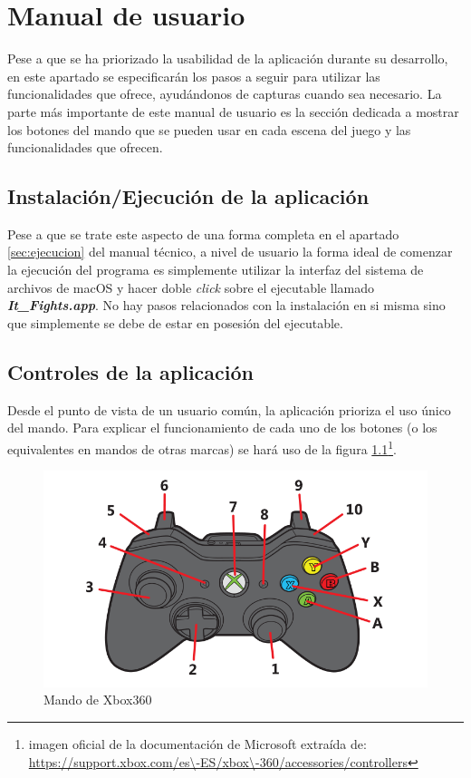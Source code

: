\chapter{Manual de usuario}

Pese a que se ha priorizado la usabilidad de la aplicación durante su desarrollo, en este apartado se especificarán los pasos a seguir para utilizar las funcionalidades que ofrece, ayudándonos de capturas cuando sea necesario. La parte más importante de este manual de usuario es la sección dedicada a mostrar los botones del mando que se pueden usar en cada escena del juego y las funcionalidades que ofrecen.

\section{Instalación/Ejecución de la aplicación}

Pese a que se trate este aspecto de una forma completa en el apartado \ref{sec:ejecucion} del manual técnico, a nivel de usuario la forma ideal de comenzar la ejecución del programa es simplemente utilizar la interfaz del sistema de archivos de macOS y hacer doble \textit{click} sobre el ejecutable llamado \textbf{\textit{It\_Fights.app}}. No hay pasos relacionados con la instalación en si misma sino que simplemente se debe de estar en posesión del ejecutable.


\section{Controles de la aplicación}
\label{sec:controles}
Desde el punto de vista de un usuario común, la aplicación prioriza el uso único del mando. Para explicar el funcionamiento de cada uno de los botones (o los equivalentes en mandos de otras marcas) se hará uso de la figura \ref{controles:mando}\footnote{imagen oficial de la documentación de Microsoft extraída de: \\ \url{https://support.xbox.com/es\-ES/xbox\-360/accessories/controllers}}.

\begin{figure}
	\centerline{\includegraphics[width=12cm]{otros/graphicalInterface/mando.png}}
	\caption{Mando de Xbox360}
	\label{controles:mando}
\end{figure}

